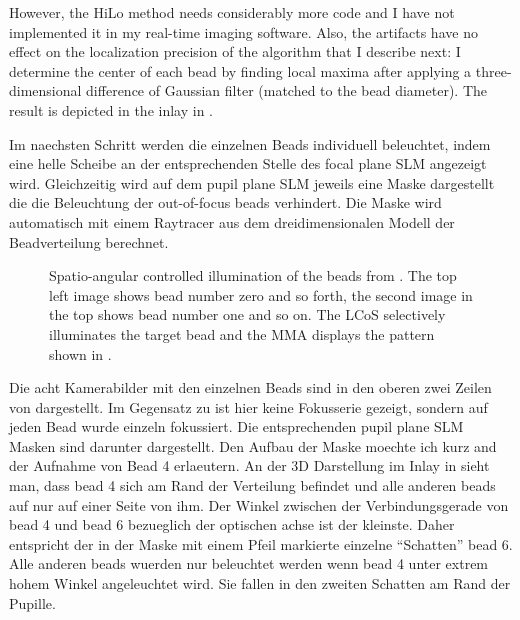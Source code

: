 However,  the HiLo method needs considerably
more code and I have not implemented it in my real-time imaging
software. Also, the artifacts have no effect on the localization
precision of the algorithm that I describe next: I determine the
center of each bead by finding local maxima after applying a
three-dimensional difference of Gaussian filter (matched to the bead
diameter). The result is depicted in the inlay in .

Im naechsten Schritt werden die einzelnen Beads individuell
beleuchtet, indem eine helle Scheibe an der entsprechenden Stelle des
focal plane SLM angezeigt wird. Gleichzeitig wird auf dem pupil plane
SLM jeweils eine Maske dargestellt die die Beleuchtung der
out-of-focus beads verhindert. Die Maske wird automatisch mit einem
Raytracer aus dem dreidimensionalen Modell der Beadverteilung
berechnet. 


\begin{figure}[hbtp]
  \centering
  \caption{Spatio-angular controlled illumination of the beads from
    . The top left image shows bead number zero and
    so forth, the second image in the top shows bead number one and so
    on. The LCoS selectively illuminates the target bead and the MMA
    displays the pattern shown in .}
  \label{fig:m_ang}
\end{figure}

Die acht Kamerabilder mit den einzelnen Beads sind in den oberen zwei
Zeilen von  dargestellt. Im Gegensatz zu
 ist hier keine Fokusserie gezeigt, sondern auf jeden
Bead wurde einzeln fokussiert. Die entsprechenden pupil plane SLM
Masken sind darunter dargestellt. Den  Aufbau der Maske moechte ich kurz and der Aufnahme von Bead 4
erlaeutern. An der 3D Darstellung im Inlay in  sieht
man, dass bead 4 sich am Rand der Verteilung befindet und alle anderen
beads auf nur auf einer Seite von ihm. Der Winkel zwischen der
Verbindungsgerade von bead 4 und bead 6 bezueglich der optischen achse
ist der kleinste. Daher entspricht der in der Maske mit einem Pfeil
markierte einzelne ``Schatten'' bead 6. Alle anderen beads wuerden nur
beleuchtet werden wenn bead 4 unter extrem hohem Winkel angeleuchtet
wird. Sie fallen in den zweiten Schatten am Rand der Pupille.

